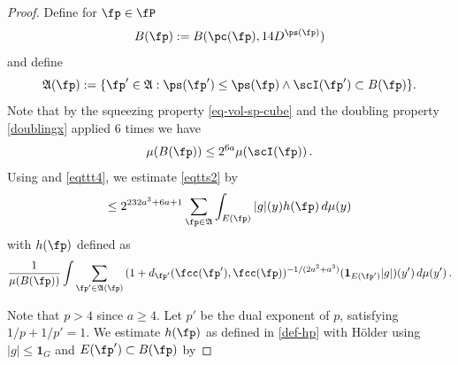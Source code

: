 \begin{proof}
Define for $\fp\in \fP$
\begin{equation}
    B(\fp):=B(\pc(\fp), 14D^{\ps(\fp)})
\end{equation}
and define
\begin{equation}
    \label{eq-Dp-definition}
    \mathfrak{A}(\fp):=\{\fp'\in\mathfrak{A}: \ps(\fp')\leq \ps(\fp) \land \scI(\fp') \subset B(\fp)\}.
\end{equation}
Note that by the squeezing property \eqref{eq-vol-sp-cube}
and the doubling property \eqref{doublingx} applied
$6$ times we have
\begin{equation}\label{eqttt4}
    \mu(B(\fp))\le 2^{6a} \mu(\scI(\fp))\, .
\end{equation}
Using  and \eqref{eqttt4}, we estimate \eqref{eqtts2} by
\begin{equation}\label{eqtts3}
     \le 2^{232a^3+6a+1} \sum_{\fp\in \mathfrak{A}}
    \int_{E(\fp)}|g|(y) h(\fp)\, d\mu(y)
\end{equation}
with $h(\fp)$ defined as
\begin{equation}\label{def-hp}
    \frac 1{\mu(B(\fp))}\int \sum_{\fp'\in \mathfrak{A}(\fp)}
    {(1+d_{\fp'}(\fcc(\fp'), \fcc(\fp))^{-1/(2a^2+a^3)}}(\mathbf{1}_{E(\fp')}|g|)(y')\, d\mu(y')\,.
\end{equation}

Note that $p>4$ since $a\ge 4$. Let $p'$ be the dual exponent of $p$, satisfying $1/p+1/p'=1$.
We estimate $h(\fp)$ as defined in \eqref{def-hp} with H\"older using $|g|\le \mathbf{1}_G$ and $E(\fp')\subset B(\fp)$ by


\end{proof}
